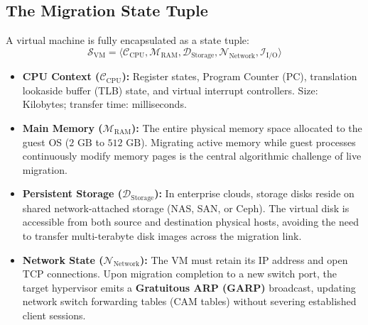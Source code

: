 \documentclass[11pt,a4paper,openany]{report}
\begin{document}
\subsection{The Migration State Tuple}
A virtual machine is fully encapsulated as a state tuple:
\begin{equation}
\mathcal{S}_{\text{VM}} = \langle \mathcal{C}_{\text{CPU}}, \mathcal{M}_{\text{RAM}}, \mathcal{D}_{\text{Storage}}, \mathcal{N}_{\text{Network}}, \mathcal{I}_{\text{I/O}} \rangle
\end{equation}
\begin{itemize}[leftmargin=*]
  \item \textbf{CPU Context ($\mathcal{C}_{\text{CPU}}$):} Register states, Program Counter (PC), translation lookaside buffer (TLB) state, and virtual interrupt controllers. Size: Kilobytes; transfer time: milliseconds.
  \item \textbf{Main Memory ($\mathcal{M}_{\text{RAM}}$):} The entire physical memory space allocated to the guest OS ($2\text{ GB}$ to $512\text{ GB}$). Migrating active memory while guest processes continuously modify memory pages is the central algorithmic challenge of live migration.
  \item \textbf{Persistent Storage ($\mathcal{D}_{\text{Storage}}$):} In enterprise clouds, storage disks reside on shared network-attached storage (NAS, SAN, or Ceph). The virtual disk is accessible from both source and destination physical hosts, avoiding the need to transfer multi-terabyte disk images across the migration link.
  \item \textbf{Network State ($\mathcal{N}_{\text{Network}}$):} The VM must retain its IP address and open TCP connections. Upon migration completion to a new switch port, the target hypervisor emits a \textbf{Gratuitous ARP (GARP)} broadcast, updating network switch forwarding tables (CAM tables) without severing established client sessions.
\end{itemize}
\end{document}
